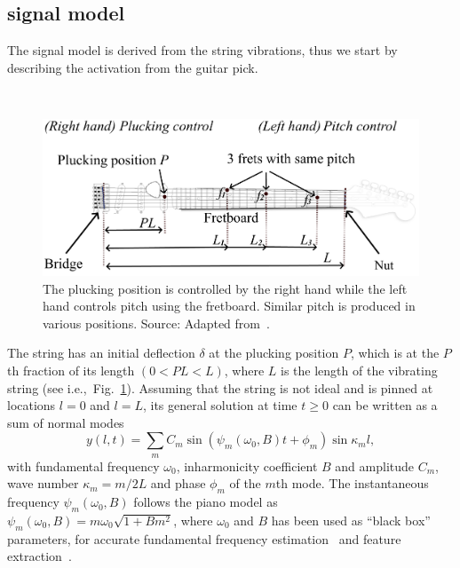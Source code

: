\documentclass{article}
\begin{document}
\begin{sloppy}
\section{signal model}
The signal model is derived from the string vibrations, thus we start by describing the activation from the guitar pick. 
%
\begin{figure}[t]\
  \centering
  \centerline{\includegraphics[width=.95\columnwidth]{img/fender_drawing5.png}}
  \caption{The plucking position is controlled by the right hand while the left hand controls pitch using the fretboard. Similar pitch is produced in various positions. Source: Adapted from~\cite{phillips}.
  }\label{fig:guitar_overview}\vspace{-2mm}
\end{figure}
%
The string has an initial deflection $\delta$ at the plucking position $P$, which is at the $P$th fraction of its length $(0<PL<L)$, where $L$ is the length of the vibrating string (see i.e.,~Fig.~\ref{fig:guitar_overview}). Assuming that the string is not ideal and is pinned at locations $l=0$ and $l=L$, its general solution at time $t\geq0$ can be written as a sum of normal modes~\cite{fletcher:physics_of_musical_instruments}
%
\begin{equation}\label{eq:modalSum}
    y(l,t) = \sum_m C_m\sin(\psi_m(\omega_0,B)t+\phi_m)\sin\kappa_ml,
\end{equation}
%
with fundamental frequency $\omega_0$, inharmonicity coefficient $B$ and amplitude $C_m$, wave number $\kappa_m = m/ 2L$ and phase $\phi_m$ of the $m$th mode. The instantaneous frequency $\psi_m(\omega_0,B)$ follows the piano model as ~\cite{fletcher:piano_model} 
$  \psi_m(\omega_0,B) = m \omega_0 \sqrt{1+B m^2}$, %
where $\omega_0$ and $B$ has been used as ``black box'' parameters, for accurate fundamental frequency estimation~\cite{galembo1994measuring, nillson:multipitch_inharmonic_signals} and feature extraction~\cite{michelson2018_aes,abesser2012feature,barbancho:inharmonicity_tablature}.

\end{sloppy}
\end{document}
